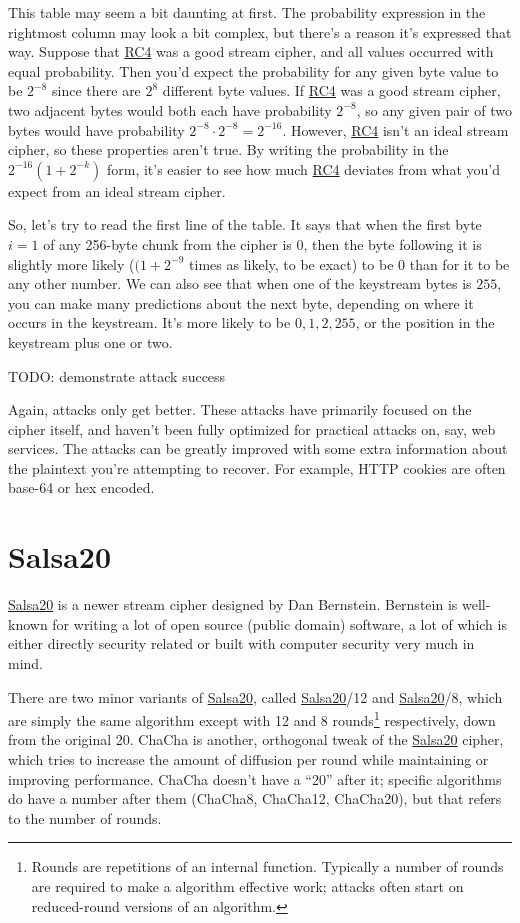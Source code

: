 \documentclass[11pt,ebook,table,dvipsnames]{memoir}
\begin{document}
This table may seem a bit daunting at first. The probability
expression in the rightmost column may look a bit complex, but there's
a reason it's expressed that way. Suppose that \hyperref[RC4]{RC4} was a good stream
cipher, and all values occurred with equal probability. Then you'd
expect the probability for any given byte value to be $2^{-8}$ since
there are $2^8$ different byte values. If \hyperref[RC4]{RC4} was a good stream
cipher, two adjacent bytes would both each have probability $2^{-8}$,
so any given pair of two bytes would have probability $2^{-8} \cdot
2^{-8} = 2^{-16}$. However, \hyperref[RC4]{RC4} isn't an ideal stream cipher, so these
properties aren't true. By writing the probability in the $2^{-16} (1 +
2^{-k})$ form, it's easier to see how much \hyperref[RC4]{RC4} deviates from what
you'd expect from an ideal stream cipher.

So, let's try to read the first line of the table. It says that when
the first byte $i = 1$ of any 256-byte chunk from the cipher is $0$,
then the byte following it is slightly more likely ($(1 + 2^{-9}$
times as likely, to be exact) to be 0 than for it to be any other
number. We can also see that when one of the keystream bytes is $255$,
you can make many predictions about the next byte, depending on where
it occurs in the keystream. It's more likely to be $0, 1, 2, 255$, or
the position in the keystream plus one or two.

TODO: demonstrate attack success

Again, attacks only get better. These attacks have primarily focused
on the cipher itself, and haven't been fully optimized for practical
attacks on, say, web services. The attacks can be greatly improved
with some extra information about the plaintext you're attempting to
recover. For example, HTTP cookies are often base-64 or hex encoded.
\section{\label{Salsa20}Salsa20}
\label{sec-2-3-10}

\hyperref[Salsa20]{Salsa20} is a newer \gls{stream cipher} designed by Dan Bernstein.
Bernstein is well-known for writing a lot of open source (public
domain) software, a lot of which is either directly security related
or built with computer security very much in mind.

There are two minor variants of \hyperref[Salsa20]{Salsa20}, called \hyperref[Salsa20]{Salsa20}/12 and
\hyperref[Salsa20]{Salsa20}/8, which are simply the same algorithm except with 12 and 8
rounds\footnote{Rounds are repetitions of an internal function. Typically a
number of rounds are required to make a algorithm effective work;
attacks often start on reduced-round versions of an algorithm.}
respectively, down from the original 20. ChaCha is another, orthogonal
tweak of the \hyperref[Salsa20]{Salsa20} cipher, which tries to increase the amount of
diffusion per round while maintaining or improving performance. ChaCha
doesn't have a \enquote{20} after it; specific algorithms do have a number
after them (ChaCha8, ChaCha12, ChaCha20), but that refers to the
number of rounds.
\end{document}
